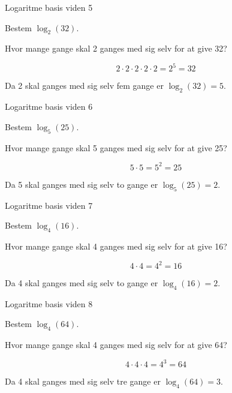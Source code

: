 \documentclass{article}
\begin{document}
\newpage


\begin{exercise}{Logaritme basis viden 5}

Bestem $\log_{2}(32)$.


\hint
Hvor mange gange skal 2 ganges med sig selv for at give 32?

\hint
\[
2 \cdot 2 \cdot 2 \cdot 2 \cdot 2 = 2^5 = 32
\]

\hint
Da 2 skal ganges med sig selv fem gange er
$\log_2(32) = 5$.

\end{exercise}

\newpage


\begin{exercise}{Logaritme basis viden 6}

Bestem $\log_{5}(25)$.


\hint
Hvor mange gange skal 5 ganges med sig selv for at give 25?

\hint
\[
5 \cdot 5 = 5^2 = 25
\]

\hint
Da 5 skal ganges med sig selv to gange er
$\log_5(25) = 2$.

\end{exercise}

\newpage


\begin{exercise}{Logaritme basis viden 7}

Bestem $\log_{4}(16)$.


\hint
Hvor mange gange skal 4 ganges med sig selv for at give 16?

\hint
\[
4 \cdot 4 = 4^2 = 16
\]

\hint
Da 4 skal ganges med sig selv to gange er
$\log_4(16) = 2$.

\end{exercise}

\newpage


\begin{exercise}{Logaritme basis viden 8}

Bestem $\log_{4}(64)$.


\hint
Hvor mange gange skal 4 ganges med sig selv for at give 64?

\hint
\[
4 \cdot 4 \cdot 4 = 4^3 = 64
\]

\hint
Da 4 skal ganges med sig selv tre gange er
$\log_4(64) = 3$.

\end{exercise}
\end{document}
